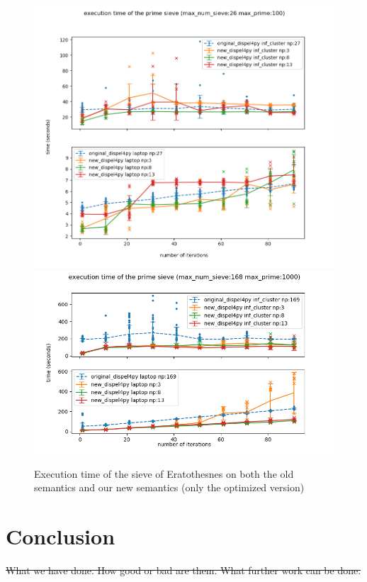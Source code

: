 \documentclass[msc,cs,logo]{infthesis}
\begin{document}
\begin{figure}[h]
	\centering
    \includegraphics[width=1\textwidth]{figures/sieve_opt1_100}
    \includegraphics[width=1\textwidth]{figures/sieve_opt1_1000}
	\caption{Execution time of the sieve of Eratothesnes on both the old semantics and our new semantics (only the optimized version)}
	\label{fig:sieve_opt1}
\end{figure}
	
	\section{Conclusion}
	\sout{What we have done. How good or bad are them. What further work can be done.}
	
	
	\pagebreak
	
	
\end{document}
